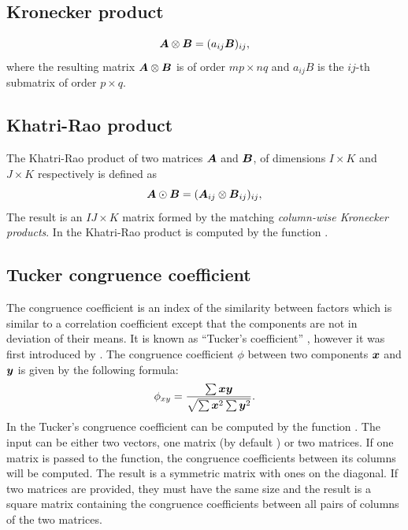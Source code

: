 \documentclass[article,shortnames, nojss]{jss}
\newcommand{\vv}[1]{\mbox{\boldmath$#1$}}
\begin{document}
\subsection* {Kronecker product}
\label{app:Kronecker}
\[
\vv{A} \otimes \vv{B} = (a_{ij} \vv{B})_{ij},
\]
where the resulting matrix $\vv{A} \otimes \vv{B}$ is of order $mp \times nq$ and $a_{ij}B$ is the $ij$-th submatrix of order $p \times q$.
\subsection* {Khatri-Rao product}
\label{app:kr}
The Khatri-Rao product of two matrices $\vv{A}$ and $\vv{B}$, of dimensions $I \times K$ and $J \times K$ respectively is defined as
\[
\vv{A} \odot \vv{B} = (\vv{A}_{ij} \otimes \vv{B}_{ij})_{ij},
\]
The result is an $IJ \times K$ matrix formed by the matching \emph{column-wise Kronecker products}.
In  the Khatri-Rao product is computed by the function .
\subsection* {Tucker congruence coefficient}
\label{app:congruence}
The congruence coefficient is an index of the similarity between factors
which is similar to a correlation coefficient except that the components are not in
deviation of their means. It is known as ``Tucker's coefficient'' \citep{Tucker:1951}, however it was first introduced by \citet{Burt:1948}.
The congruence coefficient $\phi$ between two components $\vv{x}$ and $\vv{y}$ is given by the following formula:
\[
\phi_{xy} = \frac{\sum\vv{x}\vv{y}}{\sqrt{\sum\vv{x}^2 \sum\vv{y}^2}}.
\]
In  the Tucker's congruence coefficient can be computed by the function
. The input can be either two vectors, one matrix (by default ) or two matrices. If one matrix  is passed to the function, the congruence coefficients between its columns will be computed. The result is a symmetric matrix with ones on the diagonal. If two matrices are provided, they must have the same size and the result is a square matrix containing the congruence coefficients between all pairs of columns of the two matrices.
\end{document}
